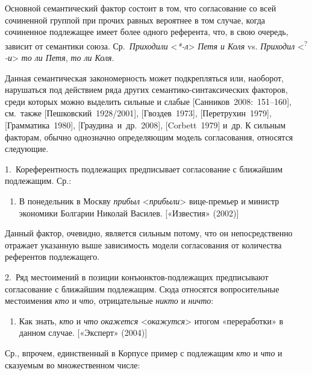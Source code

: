 Основной семантический фактор состоит в том, что согласование со всей
сочиненной группой при прочих равных вероятнее в том случае, когда
сочиненное подлежащее имеет более одного референта, что, в свою очередь,
зависит от семантики союза. Ср.~\textit{Приходили}
\textless{}\textit{*-л}\textgreater{} \textit{Петя и Коля} vs.
\textit{Приходил} \textless{}\textsuperscript{?}\textit{-и}\textgreater{}
\textit{то ли Петя}, \textit{то ли Коля}.

Данная семантическая закономерность может подкрепляться или, наоборот,
нарушаться под действием ряда других семантико-синтаксических факторов,
среди которых можно выделить сильные и слабые
{[}Санников~2008:~151--160{]}, см.~также {[}Пешковский~1928/2001{]},
{[}Гвоздев~1973{]}, {[}Перетрухин~1979{]}, {[}Грамматика~1980{]},
{[}Граудина~и~др.~2008{]}, {[}Corbett~1979{]} и~др. К сильным факторам,
обычно однозначно определяющим модель согласования, относятся следующие.

1.~Кореферентность подлежащих предписывает согласование с ближайшим
подлежащим. Ср.:

\begin{enumerate}
  \def\labelenumi{(\arabic{enumi})}
  \setcounter{enumi}{85}
  \item
        В понедельник в Москву \textit{прибыл}
        \textless*\textit{прибыли}\textgreater{} вице-премьер и министр
        экономики Болгарии Николай Василев. {[}«Известия» (2002){]}
\end{enumerate}

Данный фактор, очевидно, является сильным потому, что он непосредственно
отражает указанную выше зависимость модели согласования от количества
референтов подлежащего.

2.~Ряд местоимений в позиции конъюнктов-подлежащих предписывают
согласование с ближайшим подлежащим. Сюда относятся вопросительные
местоимения \textit{кто} и \textit{что}, отрицательные \textit{никто} и
\textit{ничто}:

\begin{enumerate}
  \def\labelenumi{(\arabic{enumi})}
  \setcounter{enumi}{86}
  \item
        Как знать, \textit{кто} и \textit{что} \textit{окажется}
        \textless*\textit{окажутся}\textgreater{} итогом «переработки» в данном
        случае. {[}«Эксперт» (2004){]}
\end{enumerate}

Ср., впрочем, единственный в Корпусе пример с подлежащим \textit{кто} и
\textit{что} и сказуемым во множественном числе:

